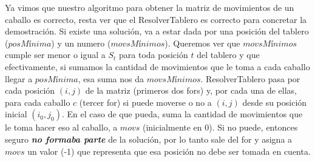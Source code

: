 \documentclass[a4paper]{article}
\begin{document}
\newline
\newline Ya vimos que nuestro algoritmo para obtener la matriz de movimientos de un caballo es correcto, resta ver que el ResolverTablero es correcto para concretar la demostración.
\newline Si existe una solución, va a estar dada por una posición del tablero ($posM$í$nima$) y un numero ($movsM$í$nimos$). Queremos ver que $movsM$í$nimos$ cumple ser menor o igual a $S_t$ para toda posición $t$ del tablero y que efectivamente, si sumamos la cantidad de movimientos que le toma a cada caballo llegar a $posM$í$nima$, esa suma nos da $movsM$í$nimos$. 
\newline ResolverTablero pasa por cada posición $(i, j)$ de la matriz (primeros dos fors) y, por cada una de ellas, para cada caballo $c$ (tercer for) si puede moverse o no a $(i, j)$ desde su posición inicial $(i_0, j_0)$. En el caso de que pueda, suma la cantidad de movimientos que le toma hacer eso al caballo, a $movs$ (inicialmente en 0). Si no puede, entonces seguro \textit{\textbf{no formaba parte}} de la solución, por lo tanto sale del for y asigna a $movs$ un valor (-1) que representa que esa posición no debe ser tomada en cuenta. 
\end{document}
